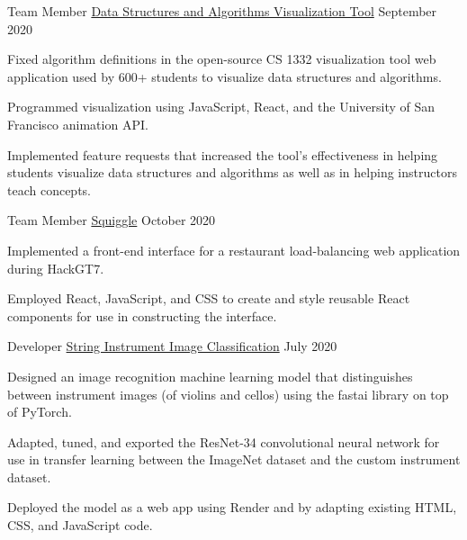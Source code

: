 \begin{cventries}

\cvproject
{Team Member} %
{
    \href{https://github.com/RodrigoDLPontes/visualization-tool}
    {Data Structures and Algorithms Visualization Tool}
} %
{} %
{September 2020} %
{ %
\begin{cvitems}
\item Fixed algorithm definitions in the open-source CS 1332 visualization tool web application
used by 600+ students to visualize data structures and algorithms.
\item Programmed visualization using JavaScript, React,
and the University of San Francisco animation API.
\item Implemented feature requests that increased the tool's effectiveness
in helping students visualize data structures and algorithms
as well as in helping instructors teach concepts.
\end{cvitems}
}

\cvproject
{Team Member} %
{
    \href{https://github.com/BadGuy-1863/HackGT7}
    {Squiggle}
} %
{} %
{October 2020} %
{ %
\begin{cvitems}
    \item Implemented a front-end interface for a restaurant load-balancing web application
    during HackGT7.
    \item Employed React, JavaScript, and CSS to 
    create and style reusable React components for use in constructing the interface.
\end{cvitems}
}

\cvproject
{Developer} %
{
    \href{https://github.com/hzhu359/fastai-v3}
    {String Instrument Image Classification}
} %
{} %
{July 2020} %
{ %
\begin{cvitems}
\item Designed an image recognition machine learning model
that distinguishes between instrument images (of violins and cellos)
using the fastai library on top of PyTorch.
\item Adapted, tuned, and exported the ResNet-34 convolutional neural network for use in transfer learning between the ImageNet dataset and the custom instrument dataset.
\item Deployed the model as a web app using Render and by adapting existing HTML, CSS, and JavaScript code.
\end{cvitems}
}


\end{cventries}
